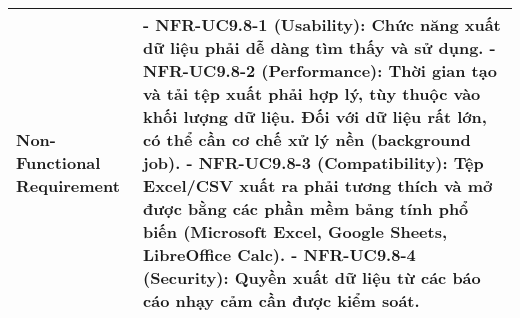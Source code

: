 \begin{longtable}{|m{4cm}|p{11cm}|}
\hline
Non-Functional Requirement & - \textbf{NFR-UC9.8-1 (Usability):} Chức năng xuất dữ liệu phải dễ dàng tìm thấy và sử dụng. \newline - \textbf{NFR-UC9.8-2 (Performance):} Thời gian tạo và tải tệp xuất phải hợp lý, tùy thuộc vào khối lượng dữ liệu. Đối với dữ liệu rất lớn, có thể cần cơ chế xử lý nền (background job). \newline - \textbf{NFR-UC9.8-3 (Compatibility):} Tệp Excel/CSV xuất ra phải tương thích và mở được bằng các phần mềm bảng tính phổ biến (Microsoft Excel, Google Sheets, LibreOffice Calc). \newline - \textbf{NFR-UC9.8-4 (Security):} Quyền xuất dữ liệu từ các báo cáo nhạy cảm cần được kiểm soát. \\
\hline
\end{longtable}

